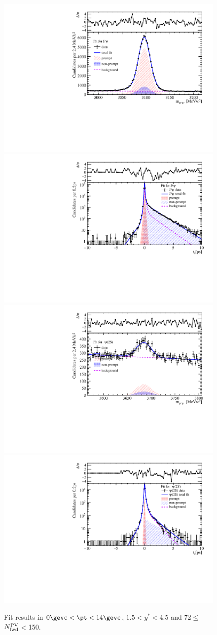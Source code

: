 \begin{figure}[H]
\begin{center}
\includegraphics[width=0.45\linewidth]{pdf/pPb/FWorkdir/TwoDimFit/ProjMass/Jpsi_n5y1pt1.pdf}
\includegraphics[width=0.45\linewidth]{pdf/pPb/FWorkdir/TwoDimFit/ProjTz/Jpsi_n5y1pt1.pdf}
\vspace*{-0.5cm}
\includegraphics[width=0.45\linewidth]{pdf/pPb/FWorkdir/TwoDimFit/ProjMass/Psi2S_n5y1pt1.pdf}
\includegraphics[width=0.45\linewidth]{pdf/pPb/FWorkdir/TwoDimFit/ProjTz/Psi2S_n5y1pt1.pdf}
\vspace*{-0.5cm}
\end{center}
\caption{Fit results in $0\gevc<\pt<14\gevc$, $1.5<y^*<4.5$ and 72$\leq$$N_{\rm fwd}^{\rm PV}$$<$150.}
\end{figure}



